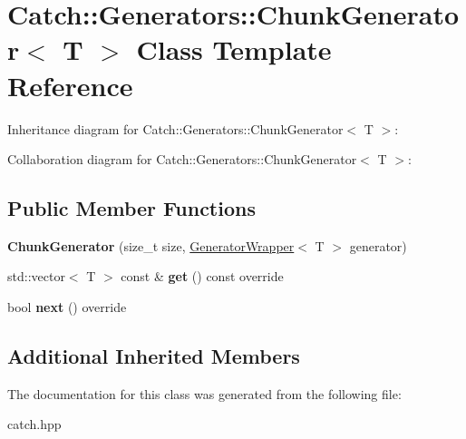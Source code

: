 \hypertarget{classCatch_1_1Generators_1_1ChunkGenerator}{}\section{Catch\+:\+:Generators\+:\+:Chunk\+Generator$<$ T $>$ Class Template Reference}
\label{classCatch_1_1Generators_1_1ChunkGenerator}


Inheritance diagram for Catch\+:\+:Generators\+:\+:Chunk\+Generator$<$ T $>$\+:


Collaboration diagram for Catch\+:\+:Generators\+:\+:Chunk\+Generator$<$ T $>$\+:
\subsection*{Public Member Functions}
\begin{DoxyCompactItemize}
\item 
\mbox{\label{classCatch_1_1Generators_1_1ChunkGenerator_a50c334d00cde3166d71e9b90ebc2d2e3}} 
{\bfseries Chunk\+Generator} (size\+\_\+t size, \hyperlink{classCatch_1_1Generators_1_1GeneratorWrapper}{Generator\+Wrapper}$<$ T $>$ generator)
\item 
\mbox{\label{classCatch_1_1Generators_1_1ChunkGenerator_aa41c7d08a165b6a18560f2ab9e977f0b}} 
std\+::vector$<$ T $>$ const  \& {\bfseries get} () const override
\item 
\mbox{\label{classCatch_1_1Generators_1_1ChunkGenerator_a545e89f80eb1e3c953491541ea083f86}} 
bool {\bfseries next} () override
\end{DoxyCompactItemize}
\subsection*{Additional Inherited Members}


The documentation for this class was generated from the following file\+:\begin{DoxyCompactItemize}
\item 
catch.\+hpp\end{DoxyCompactItemize}
